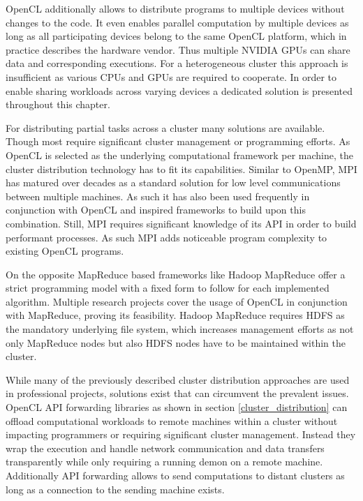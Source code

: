 OpenCL additionally allows to distribute programs to multiple devices without changes to the code. It even enables parallel computation by multiple devices as long as all participating devices belong to the same OpenCL platform, which in practice describes the hardware vendor. Thus multiple NVIDIA GPUs can share data and corresponding executions. For a heterogeneous cluster this approach is insufficient as various CPUs and GPUs are required to cooperate. In order to enable sharing workloads across varying devices a dedicated solution is presented throughout this chapter.

For distributing partial tasks across a cluster many solutions are available. Though most require significant cluster management or programming efforts. As OpenCL is selected as the underlying computational framework per machine, the cluster distribution technology has to fit its capabilities.
Similar to OpenMP, MPI has matured over decades as a standard solution for low level communications between multiple machines. As such it has also been used frequently in conjunction with OpenCL and inspired frameworks to build upon this combination. Still, MPI requires significant knowledge of its API in order to build performant processes. As such MPI adds noticeable program complexity to existing OpenCL programs.

On the opposite MapReduce based frameworks like Hadoop MapReduce offer a strict programming model with a fixed form to follow for each implemented algorithm. Multiple research projects cover the usage of OpenCL in conjunction with MapReduce, proving its feasibility\cite{hadoopcl}\cite{hadoop+}. Hadoop MapReduce requires HDFS as the mandatory underlying file system, which increases management efforts as not only MapReduce nodes but also HDFS nodes have to be maintained within the cluster.

While many of the previously described cluster distribution approaches are used in professional projects, solutions exist that can circumvent the prevalent issues. OpenCL API forwarding libraries as shown in section \ref{cluster_distribution} can offload computational workloads to remote machines within a cluster without impacting programmers or requiring significant cluster management. Instead they wrap the execution and handle network communication and data transfers transparently while only requiring a running demon on a remote machine. Additionally API forwarding allows to send computations to distant clusters as long as a connection to the sending machine exists.

